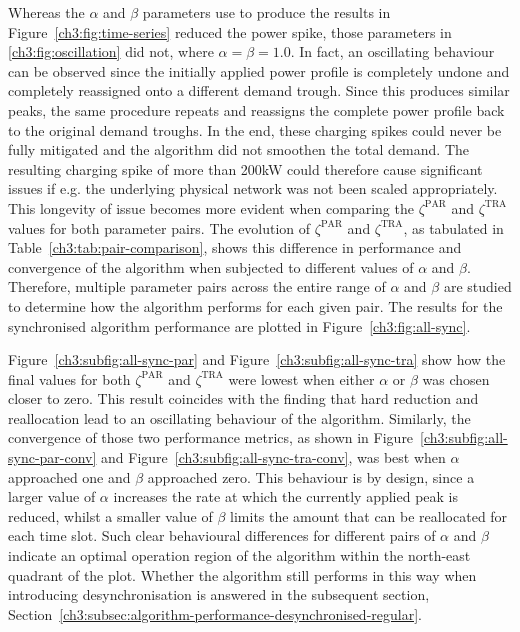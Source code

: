 

Whereas the $\alpha$ and $\beta$ parameters use to produce the results in Figure~\ref{ch3:fig:time-series} reduced the power spike, those parameters in \ref{ch3:fig:oscillation} did not, where $\alpha = \beta = 1.0$.
In fact, an oscillating behaviour can be observed since the initially applied power profile is completely undone and completely reassigned onto a different demand trough.
Since this produces similar peaks, the same procedure repeats and reassigns the complete power profile back to the original demand troughs.
In the end, these charging spikes could never be fully mitigated and the algorithm did not smoothen the total demand.
The resulting charging spike of more than 200kW could therefore cause significant issues if e.g. the underlying physical network was not been scaled appropriately.
This longevity of issue becomes more evident when comparing the $\zeta^\text{PAR}$ and $\zeta^\text{TRA}$ values for both parameter pairs.
The evolution of $\zeta^\text{PAR}$ and $\zeta^\text{TRA}$, as tabulated in Table~\ref{ch3:tab:pair-comparison}, shows this difference in performance and convergence of the algorithm when subjected to different values of $\alpha$ and $\beta$.
Therefore, multiple parameter pairs across the entire range of $\alpha$ and $\beta$ are studied to determine how the algorithm performs for each given pair.
The results for the synchronised algorithm performance are plotted in Figure~\ref{ch3:fig:all-sync}.



Figure~\ref{ch3:subfig:all-sync-par} and Figure~\ref{ch3:subfig:all-sync-tra} show how the final values for both $\zeta^\text{PAR}$ and $\zeta^\text{TRA}$ were lowest when either $\alpha$ or $\beta$ was chosen closer to zero.
This result coincides with the finding that hard reduction and reallocation lead to an oscillating behaviour of the algorithm.
Similarly, the convergence of those two performance metrics, as shown in Figure~\ref{ch3:subfig:all-sync-par-conv} and Figure~\ref{ch3:subfig:all-sync-tra-conv}, was best when $\alpha$ approached one and $\beta$ approached zero.
This behaviour is by design, since a larger value of $\alpha$ increases the rate at which the currently applied peak is reduced, whilst a smaller value of $\beta$ limits the amount that can be reallocated for each time slot.
Such clear behavioural differences for different pairs of $\alpha$ and $\beta$ indicate an optimal operation region of the algorithm within the north-east quadrant of the plot.
Whether the algorithm still performs in this way when introducing desynchronisation is answered in the subsequent section, Section~\ref{ch3:subsec:algorithm-performance-desynchronised-regular}.


